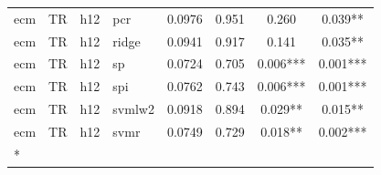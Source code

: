 \begin{ThreePartTable}
\begin{longtable}[t]{llclcccc}
ecm & TR & h12 & pcr & 0.0976 & 0.951 & 0.260 & 0.039**\\
ecm & TR & h12 & ridge & 0.0941 & 0.917 & 0.141 & 0.035**\\
ecm & TR & h12 & sp & 0.0724 & 0.705 & 0.006*** & 0.001***\\
ecm & TR & h12 & spi & 0.0762 & 0.743 & 0.006*** & 0.001***\\
ecm & TR & h12 & svmlw2 & 0.0918 & 0.894 & 0.029** & 0.015**\\
ecm & TR & h12 & svmr & 0.0749 & 0.729 & 0.018** & 0.002***\\*
\end{longtable}
\end{ThreePartTable}
\endgroup{}
